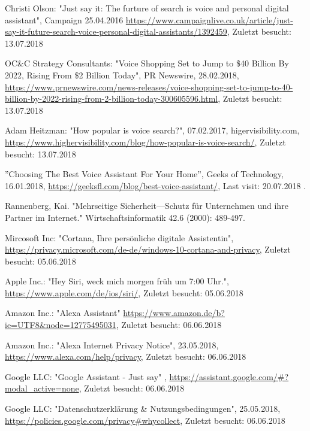 \documentclass[journal]{IEEEtran}
\begin{document}
\begin{thebibliography}{1}
Christi Olson: "Just say it: The furture of search is voice and personal digital assistant", Campaign 25.04.2016 \url{https://www.campaignlive.co.uk/article/just-say-it-future-search-voice-personal-digital-assistants/1392459},
Zuletzt besucht: 13.07.2018

OC\&C Strategy Consultants: "Voice Shopping Set to Jump to \$40 Billion By 2022, Rising From \$2 Billion Today", PR Newswire, 28.02.2018, \url{https://www.prnewswire.com/news-releases/voice-shopping-set-to-jump-to-40-billion-by-2022-rising-from-2-billion-today-300605596.html}, 
Zuletzt besucht: 13.07.2018

Adam Heitzman: "How popular is voice search?", 07.02.2017, higervisibility.com, \url{https://www.highervisibility.com/blog/how-popular-is-voice-search/},
Zuletzt besucht: 13.07.2018

”Choosing The Best Voice Assistant For Your Home”, Geeks of Technology,
16.01.2018, \url{https://geeksfl.com/blog/best-voice-assistant/}, Last visit:
20.07.2018 .

Rannenberg, Kai. "Mehrseitige Sicherheit—Schutz für Unternehmen und ihre Partner im Internet." Wirtschaftsinformatik 42.6 (2000): 489-497.

Mircosoft Inc: "Cortana, Ihre persönliche digitale Assistentin", \url{https://privacy.microsoft.com/de-de/windows-10-cortana-and-privacy},
Zuletzt besucht: 05.06.2018

Apple Inc.: "Hey Siri, weck mich morgen früh um 7:00 Uhr.",
\url{https://www.apple.com/de/ios/siri/},
Zuletzt besucht: 05.06.2018

Amazon Inc.: "Alexa Assistant"
\url{https://www.amazon.de/b?ie=UTF8&node=12775495031},
Zuletzt besucht: 06.06.2018

Amazon Inc.: "Alexa Internet Privacy Notice", 23.05.2018,
\url{https://www.alexa.com/help/privacy},
Zuletzt besucht: 06.06.2018

Google LLC: "Google Assistant - Just say" ,
\url{https://assistant.google.com/#?modal_active=none},
Zuletzt besucht: 06.06.2018

Google LLC: "Datenschutzerklärung \& Nutzungsbedingungen", 25.05.2018, \url{https://policies.google.com/privacy#whycollect},
Zuletzt besucht: 06.06.2018


\end{thebibliography}
\end{document}

